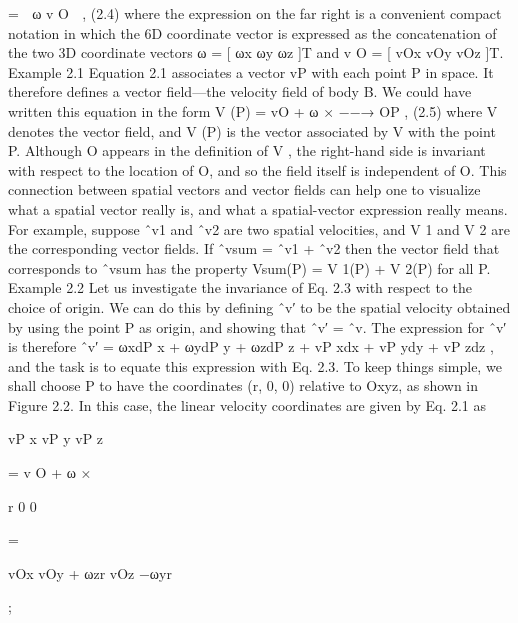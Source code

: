 =  ω v O  , (2.4) where the expression on the far right is a convenient compact notation in which the 6D coordinate vector is expressed as the concatenation of the two 3D coordinate vectors ω = [ ωx ωy ωz ]T and v O = [ vOx vOy vOz ]T. Example 2.1 Equation 2.1 associates a vector vP with each point P in space. It therefore defines a vector field—the velocity field of body B. We could have written this equation in the form V (P) = vO + ω × −−→ OP , (2.5) where V denotes the vector field, and V (P) is the vector associated by V with the point P. Although O appears in the definition of V , the right-hand side is invariant with respect to the location of O, and so the field itself is independent of O. This connection between spatial vectors and vector fields can help one to visualize what a spatial vector really is, and what a spatial-vector expression really means. For example, suppose ˆv1 and ˆv2 are two spatial velocities, and V 1 and V 2 are the corresponding vector fields. If ˆvsum = ˆv1 + ˆv2 then the vector field that corresponds to ˆvsum has the property Vsum(P) = V 1(P) + V 2(P) for all P. Example 2.2 Let us investigate the invariance of Eq. 2.3 with respect to the choice of origin. We can do this by defining ˆv′ to be the spatial velocity obtained by using the point P as origin, and showing that ˆv′ = ˆv. The expression for ˆv′ is therefore ˆv′ = ωxdP x + ωydP y + ωzdP z + vP xdx + vP ydy + vP zdz , and the task is to equate this expression with Eq. 2.3. To keep things simple, we shall choose P to have the coordinates (r, 0, 0) relative to Oxyz, as shown in Figure 2.2. In this case, the linear velocity coordinates are given by Eq. 2.1 as

vP x vP y vP z

= v O + ω ×

r 0 0

=

vOx vOy + ωzr vOz −ωyr

;


